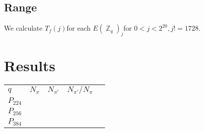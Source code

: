 \documentclass[11pt,fleqn]{article}
\newcommand{\Ej}{\ensuremath{E(\BbbZ_q)_j}}
\newcommand{\Tf}{\ensuremath{T_f(j)}}
\newcommand{\Pa}{\ensuremath{P_{224}}}
\newcommand{\Pb}{\ensuremath{P_{256}}}
\newcommand{\Pc}{\ensuremath{P_{384}}}
\begin{document}
\subsection{Range} 

We calculate \Tf for each \Ej for $0 < j < 2^20, j != 1728$.

\section{Results} 


\begin{tabular}[l]{l|rrrr}
  $q$ & $N_{\pi}$ & $N_{\pi'}$ & $N_{\pi'} / N_{\pi}$ \\
  \Pa & \\
  \Pb & \\
  \Pc & \\
  
\end{tabular}

\end{document}
